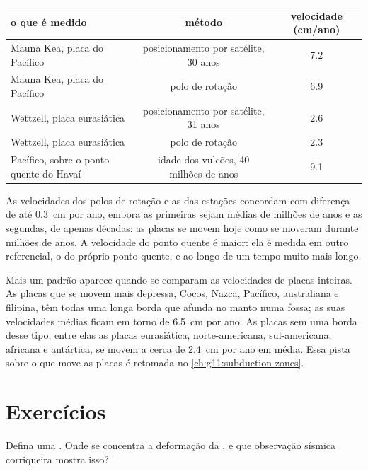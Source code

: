\begin{center}
\small
\begin{tabular}{|l|c|c|}
\hline
o que é medido & método & velocidade (\unit{cm}/ano) \\ \hline
Mauna Kea, placa do Pacífico & posicionamento por satélite, 30 anos & 7.2 \\
Mauna Kea, placa do Pacífico & polo de rotação & 6.9 \\
Wettzell, placa eurasiática & posicionamento por satélite, 31 anos & 2.6 \\
Wettzell, placa eurasiática & polo de rotação & 2.3 \\
Pacífico, sobre o ponto quente do Havaí & idade dos vulcões, 40 milhões de anos & 9.1 \\ \hline
\end{tabular}
\end{center}

As velocidades dos polos de rotação e as das estações concordam com
diferença de até \qty{0.3}{cm} por ano, embora as primeiras sejam médias de
milhões de anos e as segundas, de apenas décadas: as placas se movem hoje
como se moveram durante milhões de anos. A velocidade do ponto quente é
maior: ela é medida em outro referencial, o do próprio ponto quente, e ao
longo de um tempo muito mais longo.

Mais um padrão aparece quando se comparam as velocidades de placas
inteiras. As placas que se movem mais depressa, Cocos, Nazca, Pacífico,
australiana e filipina, têm todas uma longa borda que afunda no manto numa
fossa; as suas velocidades médias ficam em torno de \qty{6.5}{cm} por ano.
As placas sem uma borda desse tipo, entre elas as placas eurasiática,
norte-americana, sul-americana, africana e antártica, se movem a cerca de
\qty{2.4}{cm} por ano em média. Essa pista sobre o que move as placas é
retomada no \cref{ch:g11:subduction-zones}.

\section{Exercícios}

\begin{exercise}[$\star$]\label{exo:g11:plate-motions:1}
Defina uma . Onde se concentra a deformação da , e que
observação sísmica corriqueira mostra isso?
\end{exercise}

